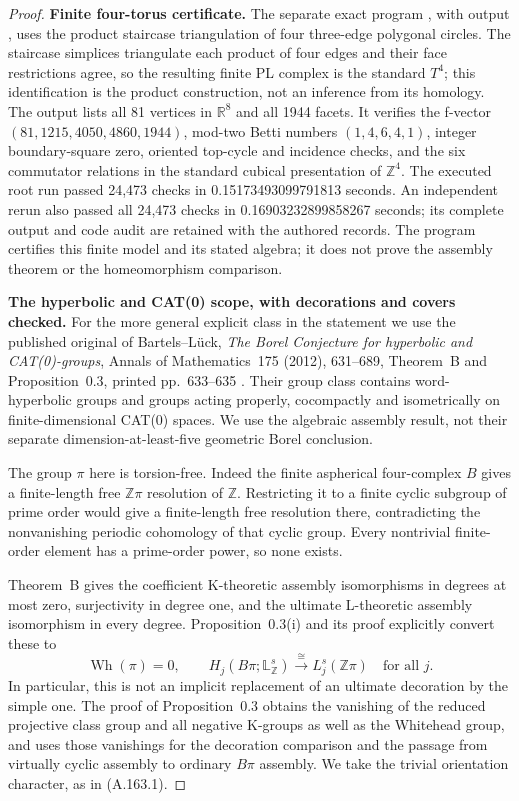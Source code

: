 \begin{proof}
\textbf{Finite four-torus certificate.}
The separate exact program , with
output , uses the product
staircase triangulation of four three-edge polygonal circles.
The staircase simplices triangulate each product of four edges and
their face restrictions agree, so the resulting finite PL complex is
the standard $T^4$; this identification is the product construction,
not an inference from its homology. The output lists all 81 vertices
in $\mathbb R^8$ and all 1944 facets. It verifies the f-vector
$(81,1215,4050,4860,1944)$, mod-two Betti numbers $(1,4,6,4,1)$,
integer boundary-square zero, oriented top-cycle and incidence checks,
and the six commutator relations in the standard cubical presentation
of $\mathbb Z^4$. The executed root run passed 24,473 checks in
0.15173493099791813 seconds. An independent rerun also passed
all 24,473 checks in 0.16903232899858267 seconds; its complete output
and code audit are retained with the authored records. The program certifies this finite model
and its stated algebra; it does not prove the assembly theorem or
the homeomorphism comparison.

\textbf{The hyperbolic and CAT(0) scope, with decorations and covers checked.}
For the more general explicit class in the statement we use the
published original of Bartels--L\"uck, \emph{The Borel Conjecture for
hyperbolic and CAT(0)-groups}, Annals of Mathematics~175 (2012),
631--689, Theorem~B and Proposition~0.3, printed pp.~633--635
\cite{BartelsLuck2012Borel}.
Their group class contains word-hyperbolic groups and groups acting
properly, cocompactly and isometrically on finite-dimensional CAT(0)
spaces. We use the algebraic assembly result, not their separate
dimension-at-least-five geometric Borel conclusion.

The group $\pi$ here is torsion-free. Indeed the finite aspherical
four-complex $B$ gives a finite-length free $\mathbb Z\pi$ resolution
of $\mathbb Z$. Restricting it to a finite cyclic subgroup of prime
order would give a finite-length free resolution there, contradicting
the nonvanishing periodic cohomology of that cyclic group. Every
nontrivial finite-order element has a prime-order power, so none exists.

Theorem~B gives the coefficient K-theoretic assembly isomorphisms in
degrees at most zero, surjectivity in degree one, and the ultimate
L-theoretic assembly isomorphism in every degree. Proposition~0.3(i)
and its proof explicitly convert these to
\[
 \operatorname{Wh}(\pi)=0,
 \qquad H_j(B\pi;\mathbb L^s_{\mathbb Z})
                \xrightarrow{\cong} L_j^s(\mathbb Z\pi)
                \quad\text{for all }j.                            \tag{A.163.16}
\]
In particular, this is not an implicit replacement of an ultimate
decoration by the simple one. The proof of Proposition~0.3 obtains
the vanishing of the reduced projective class group and all negative
K-groups as well as the Whitehead group, and uses those vanishings
for the decoration comparison and the passage from virtually cyclic
assembly to ordinary $B\pi$ assembly. We take the trivial orientation
character, as in (A.163.1).


\end{proof}
